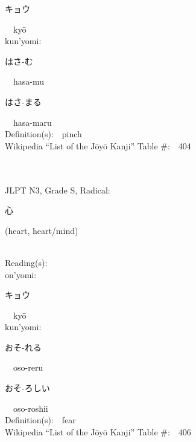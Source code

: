 \begin{multicols}{2}
{\hspace*{2em}}{\begin{CJK}{UTF8}{min} キョウ \end{CJK}}\ \ ky\=o\ \ \\
{\hspace*{1em}}kun'yomi:\ \ \\
{\hspace*{2em}}{\begin{CJK}{UTF8}{min} はさ-む \end{CJK}}\ \ hasa-mu\ \ \\
{\hspace*{2em}}{\begin{CJK}{UTF8}{min} はさ-まる \end{CJK}}\ \ hasa-maru\ \ \\
Definition(s):\ \ pinch \\
Wikipedia ``List of the J\=oy\=o Kanji'' Table \#:\ \ 404 \\
\ \ \\
{\fontsize{34pt}{40pt}  }\ \ \\  %
{JLPT N3, Grade S, Radical:\ \ {\begin{CJK}{UTF8}{min} 心 \end{CJK}} (heart, heart/mind) } \\
Reading(s):\ \ \\
{\hspace*{1em}}on'yomi:\ \ \\
{\hspace*{2em}}{\begin{CJK}{UTF8}{min} キョウ \end{CJK}}\ \ ky\=o\ \ \\
{\hspace*{1em}}kun'yomi:\ \ \\
{\hspace*{2em}}{\begin{CJK}{UTF8}{min} おそ-れる \end{CJK}}\ \ oso-reru\ \ \\
{\hspace*{2em}}{\begin{CJK}{UTF8}{min} おそ-ろしい \end{CJK}}\ \ oso-roshii\ \ \\
Definition(s):\ \ fear \\
Wikipedia ``List of the J\=oy\=o Kanji'' Table \#:\ \ 406 \\

\end{multicols}
